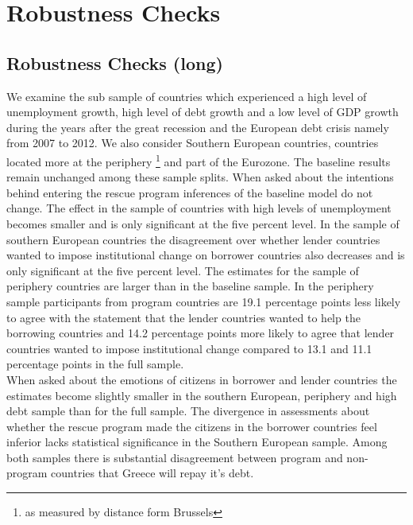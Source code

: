 \section{Robustness Checks}
\subsection{Robustness Checks (long) }
 We examine the sub sample of countries which experienced a high level of unemployment growth, high level of debt growth and a low level of GDP growth during the years after the great recession and the European debt crisis namely from 2007 to 2012. We also consider Southern European countries, countries located more at the periphery \footnote{as measured by distance form Brussels} and part of the Eurozone. The baseline results remain unchanged among these sample splits. When asked about the intentions behind entering the rescue program inferences of the baseline model do not change. The effect in the sample of countries with high levels of unemployment becomes smaller and is only significant at the five percent level. In the sample of southern European countries the disagreement over whether lender countries wanted to impose institutional change on borrower countries also decreases and is only significant at the five percent level. The estimates for the sample of periphery countries are larger than in the baseline sample. In the periphery sample participants from program countries are 19.1 percentage points less likely to agree with the statement that the lender countries wanted to help the borrowing countries and 14.2 percentage points more likely to agree that lender countries wanted to impose institutional change compared to 13.1 and 11.1 percentage points in the full sample.\\
When asked about the emotions of citizens in borrower and lender countries the estimates become slightly smaller in the southern European, periphery and high debt sample than for the full sample. The divergence in assessments about whether the rescue program made the citizens in the borrower countries feel inferior lacks statistical significance in the Southern European sample. Among both samples there is substantial disagreement between program and non-program countries that Greece will repay it's debt. 
\\
